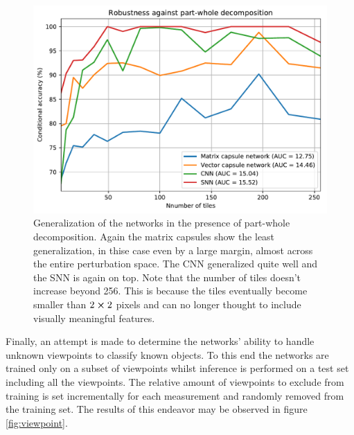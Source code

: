 \begin{figure}[H]
    \centering
\includegraphics[width=\textwidth]{figures/part-whole.pdf}
\caption[Generalization of the networks in the presence of part-whole decomposition]{Generalization of the networks in the presence of part-whole decomposition. Again the matrix capsules show the least generalization, in thise case even by a large margin, almost across the entire perturbation space. The CNN generalized quite well and the SNN is again on top. Note that the number of tiles doesn't increase beyond 256. This is because the tiles eventually become smaller than $2\cross 2$ pixels and can no longer thought to include visually meaningful features.}\label{fig:part-whole-generalization}
\end{figure}\noindent
Finally, an attempt is made to determine the networks' ability to handle unknown viewpoints to classify known objects. To this end the networks are trained only on a subset of viewpoints whilst inference is performed on a test set including all the viewpoints. The relative amount of viewpoints to exclude from training is set incrementally for each measurement and randomly removed from the training set. The results of this endeavor may be observed in figure \ref{fig:viewpoint}.\newpage\noindent
